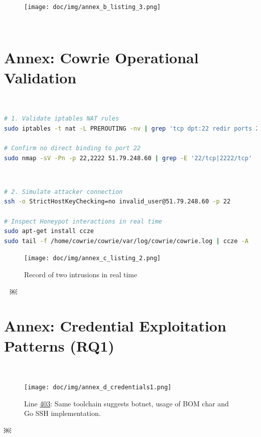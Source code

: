 \begin{figure}[h!]
    \centering
    \texttt{[image: doc/img/annex\_b\_listing\_3.png]}
\end{figure}
\





\newpage

\section{Annex: Cowrie Operational Validation}  
\label{annex:cowrie-validation}  
\
\
\begin{lstlisting}[language=bash,label={lst:cowrie-redirect},caption={Traffic Redirection Verification}]  
# 1. Validate iptables NAT rules  
sudo iptables -t nat -L PREROUTING -nv | grep 'tcp dpt:22 redir ports 2222'  

# Confirm no direct binding to port 22  
sudo nmap -sV -Pn -p 22,2222 51.79.248.60 | grep -E '22/tcp|2222/tcp'  
\end{lstlisting}  
\
\begin{lstlisting}[language=bash,label={lst:cowrie-access},caption={Honeypot Engagement Testing}]  
# 2. Simulate attacker connection  
ssh -o StrictHostKeyChecking=no invalid_user@51.79.248.60 -p 22  

# Inspect Honeypot interactions in real time  
sudo apt-get install ccze
sudo tail -f /home/cowrie/cowrie/var/log/cowrie/cowrie.log | ccze -A  
\end{lstlisting}  
\begin{figure}[h!]
    \centering
    \texttt{[image: doc/img/annex\_c\_listing\_2.png]}
    \caption*{Record of two intrusions in real time}
\end{figure}

\
\newpage
￼
\section{Annex: Credential Exploitation Patterns (RQ1)}  
\label{annex:log-credential1}  
\

\begin{figure}[h!]
    \centering
    \texttt{[image: doc/img/annex\_d\_credentials1.png]}
    \caption*{Line \href{https://github.com/nottoBD/netsec-honeypot/blob/master/log/cowrie.json.2025-06-11}{403}: Same toolchain suggests botnet, usage of BOM char and Go SSH implementation.}
\end{figure}
￼

